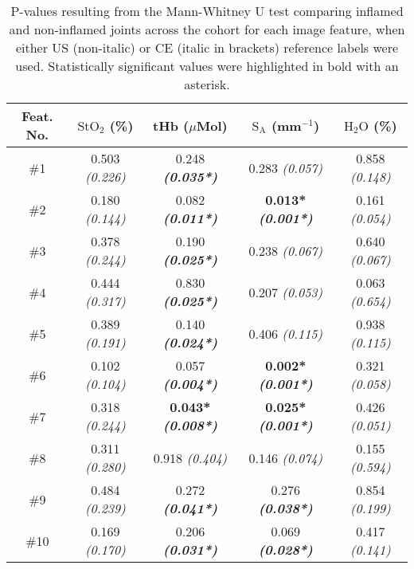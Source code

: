 \documentclass[twoside]{bhamthesis}
\theoremstyle{definition}
\begin{document}
\begin{table}[!ht]
\small
\caption{P-values resulting from the Mann-Whitney U test comparing inflamed and non-inflamed joints across the cohort for each image feature, when either US (non-italic) or CE (italic in brackets) reference labels were used. Statistically significant values were highlighted in bold with an asterisk.} 
\label{tab:Diseased p values}
\begin{center}       
\begin{tabular}{|c| c c c c|}
\hline
\rule[-1ex]{0pt}{3.5ex}  Feat. No. &  $\mathrm{StO_2}$ (\%) & tHb ($\mu$Mol) & $\mathrm{S_A}$ (mm$^{-1}$) & $\mathrm{H_2O}$ (\%) \\
\hline
\rule[-1ex]{0pt}{3.5ex}  \#1  & 0.503 \textit{(0.226)} & 0.248 \textbf{\textit{(0.035*)}} & 0.283 \textit{(0.057)} & 0.858 \textit{(0.148)}  \\
\rule[-1ex]{0pt}{3.5ex}  \#2 & 0.180 \textit{(0.144)} & 0.082 \textbf{\textit{(0.011*)}} & \textbf{0.013*} \textbf{\textit{(0.001*)}} & 0.161 \textit{(0.054)}  \\ 
\rule[-1ex]{0pt}{3.5ex}  \#3 & 0.378 \textit{(0.244)} & 0.190 \textbf{\textit{(0.025*)}}   & 0.238 \textit{(0.067)} & 0.640 \textit{(0.067)}  \\
\rule[-1ex]{0pt}{3.5ex}  \#4 & 0.444 \textit{(0.317)} & 0.830 \textbf{\textit{(0.025*)}} & 0.207 \textit{(0.053)} & 0.063 \textit{(0.654)}  \\
\rule[-1ex]{0pt}{3.5ex}  \#5 & 0.389 \textit{(0.191)} & 0.140 \textbf{\textit{(0.024*)}}  & 0.406 \textit{(0.115)} & 0.938 \textit{(0.115)} \\
\rule[-1ex]{0pt}{3.5ex}  \#6 & 0.102 \textit{(0.104)} & 0.057 \textbf{\textit{(0.004*)}} & \textbf{0.002*} \textbf{\textit{(0.001*)}} & 0.321 \textit{(0.058)} \\ 
\rule[-1ex]{0pt}{3.5ex}  \#7   & 0.318 \textit{(0.244)} & \textbf{0.043*} \textbf{\textit{(0.008*)}} & \textbf{0.025*}\textbf{ \textit{(0.001*)}} & 0.426 \textit{(0.051)} \\
\rule[-1ex]{0pt}{3.5ex}  \#8 & 0.311 \textit{(0.280)} & 0.918 \textit{(0.404)} & 0.146 \textit{(0.074)} & 0.155 \textit{(0.594)}   \\
\rule[-1ex]{0pt}{3.5ex}  \#9 & 0.484 \textit{(0.239)} & 0.272 \textbf{\textit{(0.041*)}}  & 0.276 \textbf{\textit{(0.038*)}} & 0.854 \textit{(0.199)}  \\
\rule[-1ex]{0pt}{3.5ex}  \#10 & 0.169 \textit{(0.170)} & 0.206 \textbf{\textit{(0.031*)}}  & 0.069 \textbf{\textit{(0.028*)}} & 0.417 \textit{(0.141)}  \\ 

\end{tabular}
\end{center}
\end{table}
\end{document}
